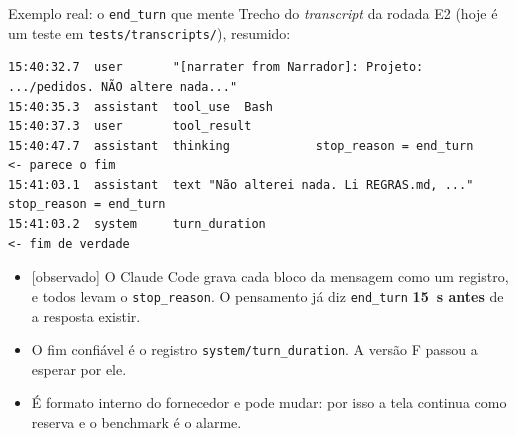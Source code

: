 \documentclass[11pt,aspectratio=169]{beamer}
\newcommand{\ev}[2]{{\scriptsize\sffamily\colorbox{#1!12}{\textcolor{#1!80!black}{[#2]}}}}
\newcommand{\observado}{\ev{cDevA}{observado}}
\begin{document}
\begin{frame}[fragile]{Exemplo real: o \texttt{end\_turn} que mente}
\small
Trecho do \emph{transcript} da rodada E2 (hoje é um teste em \texttt{tests/transcripts/}), resumido:
\begin{lstlisting}
15:40:32.7  user       "[narrater from Narrador]: Projeto: .../pedidos. NÃO altere nada..."
15:40:35.3  assistant  tool_use  Bash
15:40:37.3  user       tool_result
15:40:47.7  assistant  thinking            stop_reason = end_turn     <- parece o fim
15:41:03.1  assistant  text "Não alterei nada. Li REGRAS.md, ..."  stop_reason = end_turn
15:41:03.2  system     turn_duration                                    <- fim de verdade
\end{lstlisting}
\vspace{0.4em}
\begin{itemize}\setlength\itemsep{0.3em}
\item \observado{} O Claude Code grava cada bloco da mensagem como um registro, e todos levam o \texttt{stop\_reason}.
  O pensamento já diz \texttt{end\_turn} \textbf{15~s antes} de a resposta existir.
\item O fim confiável é o registro \texttt{system/turn\_duration}. A versão F passou a esperar por ele.
\item É formato interno do fornecedor e pode mudar: por isso a tela continua como reserva e o benchmark é o alarme.
\end{itemize}
\end{frame}
\end{document}

